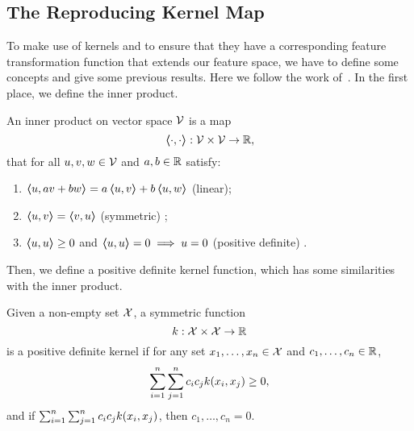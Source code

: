 
\subsection{The Reproducing Kernel Map} %
To make use of kernels and to ensure that they have a corresponding feature transformation function that extends our feature space, we have to define some concepts and give some previous results. Here we follow the work of~\citet{ScholkopfS02}.
In the first place, we define the inner product.
%
\begin{definition}
    An inner product on vector space $\mathcal{V}$ is a map
    $$\bm{\left\langle} \cdot, \cdot \bm{\right\rangle}: \mathcal{V} \times \mathcal{V} \to \mathbb{R} , $$
    that for all $u, v, w \in \mathcal{V}$ and $a, b \in \mathbb{R}$ satisfy:
    \begin{enumerate}
        \item $\bm{\left\langle} u, a v + b w \bm{\right\rangle} = a\bm{\left\langle} u, v \bm{\right\rangle} + b\bm{\left\langle} u, w \bm{\right\rangle}$ (linear);
        \item $\bm{\left\langle} u, v \bm{\right\rangle} = \bm{\left\langle} v, u \bm{\right\rangle}$ (symmetric) ;
        \item $\bm{\left\langle} u, u \bm{\right\rangle} \geq 0$ and $\bm{\left\langle} u, u \bm{\right\rangle} = 0 \implies u = 0$ (positive definite) .
    \end{enumerate} 
\end{definition}
%
Then, we define a positive definite kernel function, which has some similarities with the inner product.
\begin{definition}
    Given a non-empty set $\mathcal{X}$, a symmetric function
    \begin{equation}
        \nonumber
        k: \mathcal{X} \times \mathcal{X} \to \mathbb{R}
    \end{equation}
    is a positive definite kernel if for any set $x_1, \ldots, x_n \in \mathcal{X}$ and $c_1, \ldots, c_n \in \mathbb{R}$,
    \begin{equation}
        \nonumber
        \sum_{i=1}^n \sum_{j=1}^n c_i c_j k(x_i, x_j) \geq 0 ,
    \end{equation} 
    and if $\sum_{i=1}^n \sum_{j=1}^n c_i c_j k(x_i, x_j)$, then $c_1, \ldots, c_n = 0$.
\end{definition}
